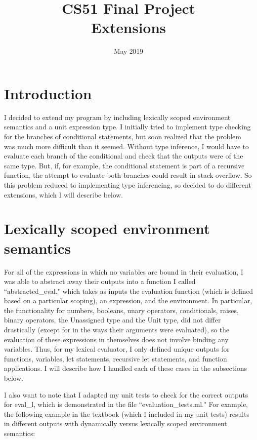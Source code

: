 \documentclass{article}
\title{CS51 Final Project \\ \large Extensions}
\date{May 2019}
\begin{document}
\maketitle

\section{Introduction}
I decided to extend my program by including lexically scoped environment semantics and a unit expression type. I initially tried to implement type checking for the branches of conditional statements, but soon realized that the problem was much more difficult than it seemed. Without type inference, I would have to evaluate each branch of the conditional and check that the outputs were of the same type. But, if, for example, the conditional statement is part of a recursive function, the attempt to evaluate both branches could result in stack overflow. So this problem reduced to implementing type inferencing, so decided to do different extensions, which I will describe below.

\section{Lexically scoped environment semantics}
For all of the expressions in which no variables are bound in their evaluation, I was able to abstract away their outputs into a function I called ``abstracted\_eval," which takes as inputs the evaluation function (which is defined based on a particular scoping), an expression, and the environment. In particular, the functionality for numbers, booleans, unary operators, conditionals, raises,
binary operators, the Unassigned type and the Unit type, did not differ drastically (except for in the ways their arguments were evaluated), so the evaluation of these expressions in themselves does not involve binding any variables. Thus, for my lexical evaluator, I only defined unique outputs for functions, variables, let statements, recursive let statements, and function applications. I will describe how I handled each of these cases in the subsections below. 

I also want to note that I adapted my unit tests to check for the correct outputs for eval\_l, which is demonstrated in the file ``evaluation\_tests.ml." For example, the following example in the textbook (which I included in my unit tests) results in different outputs with dynamically versus lexically scoped environment semantics:
\end{document}
